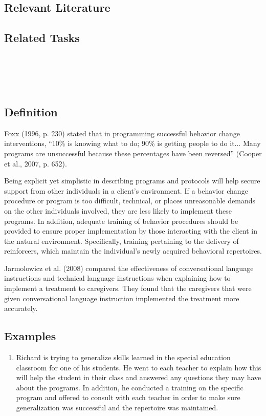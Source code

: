 \subsection{Relevant Literature}
\begin{refsection}
\nocite{bailey201025,
        bailey2013ethics,
        bac2014professional}
\printbibliography[heading=none]
\end{refsection} 
%                         
\subsection{Related Tasks}
\fourgSeven{}\\
\fourkNine{}\\
\fourkTen{}\\
%
\clearpage \section[\fourkNine{}]{\fourkNine{}%
              }
\subsection{Definition}
Foxx (1996, p. 230) stated that in programming successful behavior change interventions, ``10\% is knowing what to do; 90\% is getting people to do it... Many programs are unsuccessful because these percentages have been reversed'' (Cooper et al., 2007, p. 652). 

Being explicit yet simplistic in describing programs and protocols will help secure support from other individuals in a client's environment. If a behavior change procedure or program is too difficult, technical, or places unreasonable demands on the other individuals involved, they are less likely to implement these programs. In addition, adequate training of behavior procedures should be provided to ensure proper implementation by those interacting with the client in the natural environment. Specifically, training pertaining to the delivery of reinforcers, which maintain the individual's newly acquired behavioral repertoires.

Jarmolowicz et al. (2008) compared the effectiveness of conversational language instructions and technical language instructions when explaining how to implement a treatment to caregivers. They found that the caregivers that were given conversational language instruction implemented the treatment more accurately.
%
\subsection{Examples}
\begin{enumerate}
\item Richard is trying to generalize skills learned in the special education classroom for one of his students. He went to each teacher to explain how this will help the student in their class and answered any questions they may have about the programs. In addition, he conducted a training on the specific program and offered to consult with each teacher in order to make sure generalization was successful and the repertoire was maintained.
%
\end{enumerate}
%
